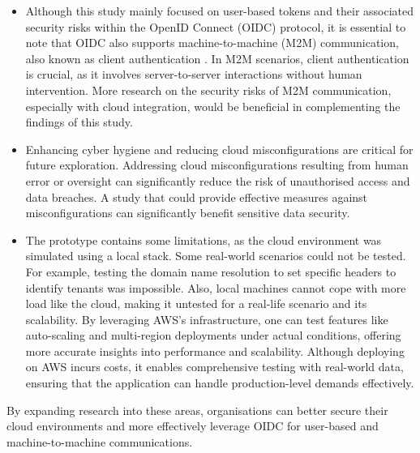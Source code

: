 \begin{itemize} 
    
    \item Although this study mainly focused on user-based tokens and their associated security risks within the OpenID Connect (OIDC) protocol, it is essential to note that OIDC also supports machine-to-machine (M2M) communication, also known as client authentication \citep{openid_docs}. In M2M scenarios, client authentication is crucial, as it involves server-to-server interactions without human intervention. More research on the security risks of M2M communication, especially with cloud integration, would be beneficial in complementing the findings of this study.

    \item Enhancing cyber hygiene and reducing cloud misconfigurations are critical for future exploration. Addressing cloud misconfigurations resulting from human error or oversight can significantly reduce the risk of unauthorised access and data breaches. A study that could provide effective measures against misconfigurations can significantly benefit sensitive data security.

    \item The prototype contains some limitations, as the cloud environment was simulated using a local stack.
    Some real-world scenarios could not be tested.
    For example, testing the domain name resolution to set specific headers to identify tenants was impossible.
    Also, local machines cannot cope with more load like the cloud, making it untested for a real-life scenario and its scalability.
    By leveraging AWS's infrastructure, one can test features like auto-scaling and multi-region deployments under actual conditions, offering more accurate insights into performance and scalability.
    Although deploying on AWS incurs costs, it enables comprehensive testing with real-world data, ensuring that the application can handle production-level demands effectively.
\end{itemize}






By expanding research into these areas, organisations can better secure their cloud environments and more effectively leverage OIDC for user-based and machine-to-machine communications.


